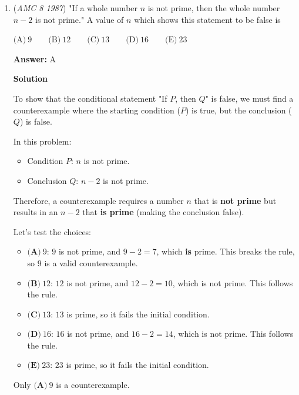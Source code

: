 \begin{enumerate}
 $\text{(A)}\ 4 \qquad \text{(B)}\ 5 \qquad \text{(C)}\ 8 \qquad \text{(D)}\ 9 \qquad \text{(E)}\ 250$

 \textbf{Answer: }A



\textbf{Solution}

We just brute force this:
 \begin{align*} 2 &\rightarrow 4 \\ &\rightarrow 16 \\ &\rightarrow 256 \\ &\rightarrow 65536>500  \end{align*}


 Clearly we need to press the button $4$ times, so $\boxed{\text{A}}$



	\item (\textit{AMC 8 1987}) "If a whole number $n$ is not prime, then the whole number $n-2$ is not prime." A value of $n$ which shows this statement to be false is


 $\text{(A)}\ 9 \qquad \text{(B)}\ 12 \qquad \text{(C)}\ 13 \qquad \text{(D)}\ 16 \qquad \text{(E)}\ 23$

 \textbf{Answer: }A



\textbf{Solution}

To show that the conditional statement "If $P$, then $Q$" is false, we must find a counterexample where the starting condition ($P$) is true, but the conclusion ($Q$) is false. 

 In this problem:

 
            \begin{itemize}
        \item Condition $P$: $n$ is not prime.
        \item Conclusion $Q$: $n-2$ is not prime.
            \end{itemize}
            Therefore, a counterexample requires a number $n$ that is \textbf{not prime} but results in an $n-2$ that \textbf{is prime} (making the conclusion false).

 Let's test the choices:

 
            \begin{itemize}
        \item $\textbf{(A)}\ 9$: $9$ is not prime, and $9-2=7$, which \textbf{is} prime. This breaks the rule, so $9$ is a valid counterexample.
        \item $\textbf{(B)}\ 12$: $12$ is not prime, and $12-2=10$, which is not prime. This follows the rule.
        \item $\textbf{(C)}\ 13$: $13$ is prime, so it fails the initial condition.
        \item $\textbf{(D)}\ 16$: $16$ is not prime, and $16-2=14$, which is not prime. This follows the rule.
        \item $\textbf{(E)}\ 23$: $23$ is prime, so it fails the initial condition.
            \end{itemize}
            Only $\boxed{\textbf{(A)}\ 9}$ is a counterexample.


\end{enumerate}

